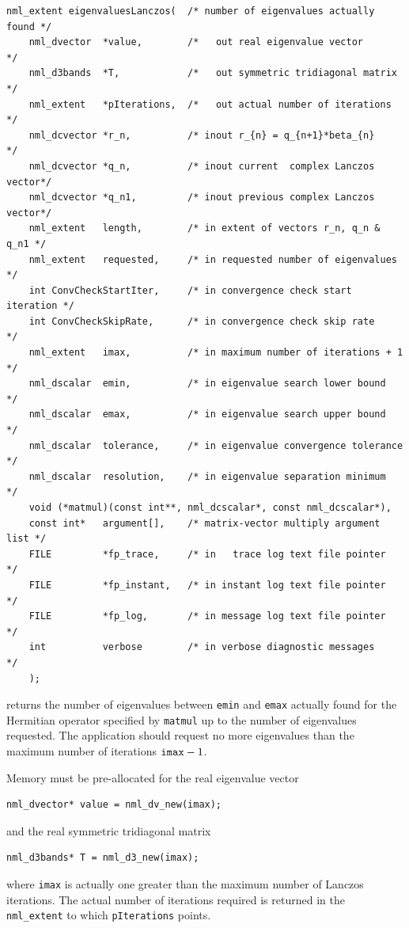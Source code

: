 \documentclass[twoside,12pt]{article}
\begin{document}
\begin{verbatim}
nml_extent eigenvaluesLanczos(  /* number of eigenvalues actually found */
    nml_dvector  *value,        /*   out real eigenvalue vector         */
    nml_d3bands  *T,            /*   out symmetric tridiagonal matrix   */
    nml_extent   *pIterations,  /*   out actual number of iterations    */
    nml_dcvector *r_n,          /* inout r_{n} = q_{n+1}*beta_{n}       */
    nml_dcvector *q_n,          /* inout current  complex Lanczos vector*/
    nml_dcvector *q_n1,         /* inout previous complex Lanczos vector*/
    nml_extent   length,        /* in extent of vectors r_n, q_n & q_n1 */
    nml_extent   requested,     /* in requested number of eigenvalues   */
    int ConvCheckStartIter,     /* in convergence check start iteration */
    int ConvCheckSkipRate,      /* in convergence check skip rate       */
    nml_extent   imax,          /* in maximum number of iterations + 1  */
    nml_dscalar  emin,          /* in eigenvalue search lower bound     */
    nml_dscalar  emax,          /* in eigenvalue search upper bound     */
    nml_dscalar  tolerance,     /* in eigenvalue convergence tolerance  */
    nml_dscalar  resolution,    /* in eigenvalue separation minimum     */
    void (*matmul)(const int**, nml_dcscalar*, const nml_dcscalar*),
    const int*   argument[],    /* matrix-vector multiply argument list */
    FILE         *fp_trace,     /* in   trace log text file pointer     */
    FILE         *fp_instant,   /* in instant log text file pointer     */
    FILE         *fp_log,       /* in message log text file pointer     */
    int          verbose        /* in verbose diagnostic messages       */
    );
\end{verbatim}
returns the number of eigenvalues between {\tt emin} and {\tt emax}
actually found for the Hermitian operator specified by {\tt matmul}
up to the number of eigenvalues requested.
The application should request no more eigenvalues
than the maximum number of iterations $\mbox{{\tt imax}} - 1$.

Memory must be pre-allocated for the real eigenvalue vector
\begin{verbatim}
nml_dvector* value = nml_dv_new(imax);
\end{verbatim}
and the real symmetric tridiagonal matrix
\begin{verbatim}
nml_d3bands* T = nml_d3_new(imax);
\end{verbatim}
where {\tt imax} is actually one greater than
the maximum number of Lanczos iterations.
The actual number of iterations required
is returned in the {\tt nml\_extent} to which {\tt pIterations} points.
\end{document}
